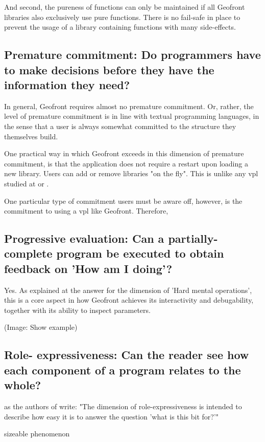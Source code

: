 And second, the pureness of functions can only be maintained if all Geofront libraries also exclusively use pure functions. 
There is no fail-safe in place to prevent the usage of a library containing functions with many side-effects. 

\subsection*{Premature commitment: Do programmers have to make decisions before they have the information they need?}

In general, Geofront requires almost no premature commitment. 
Or, rather, the level of premature commitment is in line with textual programming languages, in the sense that a user is always somewhat committed to the structure they themselves build. 

One practical way in which Geofront exceeds in this dimension of premature commitment, is that the application does not require a restart upon loading a new library. 
Users can add or remove libraries "on the fly". 
This is unlike any vpl studied at  or .

One particular type of commitment users must be aware off, however, is the commitment to using a \ac{vpl} like Geofront. 
Therefore, 


\subsection*{Progressive evaluation: Can a partially-complete program be executed to obtain feedback on 'How am I doing'?}

Yes. 
As explained at the answer for the dimension of 'Hard mental operations', this is a core aspect in how Geofront achieves its interactivity and debugability, together with its ability to inspect parameters. 

(Image: Show example)

\subsection*{Role- expressiveness: Can the reader see how each component of a program relates to the whole?}

as the authors of \cite[]{green_usability_1996} write: "The dimension of role-expressiveness is intended to describe how easy it is to answer the question 'what is this bit for?'"

sizeable phenomenon

